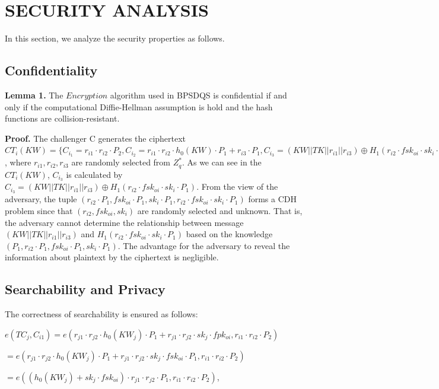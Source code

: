 \documentclass[journal]{IEEEtran}
\begin{document}
    \section{SECURITY ANALYSIS}

    In this section, we analyze the security properties as follows.

    \subsection{Confidentiality}

    \textbf{Lemma 1.} 
    The $Encryption$ algorithm used in BPSDQS is confidential if and only if the computational Diffie-Hellman assumption is hold and the hash functions are collision-resistant.

    \textbf{Proof.}
    The challenger C generates the ciphertext $CT_i(KW)=\{C_{i_1}=r_{i1} \cdot r_{i2} \cdot P_2, C_{i_2}=r_{i1} \cdot r_{i2} \cdot h_0(KW) \cdot P_1 + r_{i3} \cdot P_1, C_{i_3}=(KW||TK||r_{i1}||r_{i3}) \oplus H_1(r_{i2} \cdot fsk_{oi} \cdot sk_i \cdot P_1), V_{KW}=H_2(C_{i1}||C_{i2}||(r_{i2} \cdot P_1)), D_{KW}=r_{i2}-V_{KW} \cdot fsk_{oi}\}$, where $r_{i1},r_{i2},r_{i3}$ are randomly selected from $Z_q^*$. As we can see in the $CT_i(KW)$, $C_{i_3}$ is calculated by $C_{i_3}=(KW||TK||r_{i1}||r_{i3}) \oplus H_1(r_{i2} \cdot fsk_{oi} \cdot sk_i \cdot P_1)$. From the view of the adversary, the tuple $(r_{i2} \cdot P_1 , fsk_{oi}  \cdot P_1, sk_i \cdot P_1 , r_{i2} \cdot fsk_{oi} \cdot sk_i \cdot P_1)$ forms a CDH problem since that $(r_{i2}, fsk_{oi}, sk_i)$ are randomly selected and unknown. That is, the adversary cannot determine the relationship between message $(KW||TK||r_{i1}||r_{i3})$ and $H_1(r_{i2} \cdot fsk_{oi} \cdot sk_i \cdot P_1)$ based on the knowledge $(P_1, r_{i2} \cdot P_1,  fsk_{oi}  \cdot P_1, sk_i \cdot P_1)$. The advantage for the adversary to reveal the information about plaintext by the ciphertext is negligible.

    \subsection{Searchability and Privacy}

    The correctness of searchability is ensured as follows:

\begin{center}
$e(TC_j, C_{i1}) = e(r_{j1} \cdot r_{j2} \cdot h_0(KW_j) \cdot P_1 + r_{j1} \cdot r_{j2} \cdot sk_j \cdot fpk_{oi}, r_{i1} \cdot r_{i2} \cdot P_2)$
    
$= e(r_{j1} \cdot r_{j2} \cdot h_0(KW_j) \cdot P_1 + r_{j1} \cdot r_{j2} \cdot sk_j \cdot fsk_{oi} \cdot P_1, r_{i1} \cdot r_{i2} \cdot P_2)$
    
$= e((h_0(KW_j) + sk_j \cdot fsk_{oi}) \cdot r_{j1} \cdot r_{j2} \cdot P_1, r_{i1} \cdot r_{i2} \cdot P_2)$,
\end{center}
\end{document}

